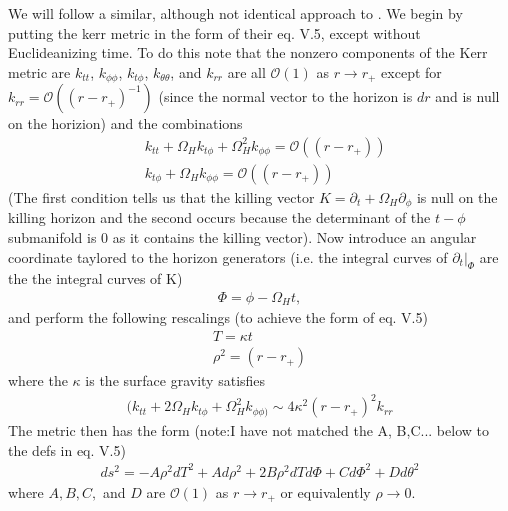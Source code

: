 \documentclass[aps,prd,amsmath,showpacs,amssymb,superscriptaddress,nofootinbib,longbibliography,eqsecnum,preprintnumbers]{revtex4-1}
\newcommand{\zach}[1]{\textcolor{ForestGreen}{#1}}
\begin{document}
We will follow a similar, although not identical approach to \cite{Dias:2015nua}. We begin by putting the kerr metric in the form of their eq. V.5, except without Euclideanizing time. To do this note that the nonzero components of the Kerr metric are $k_{tt}$, $k_{\phi\phi}$, $k_{t\phi}$, $k_{\theta\theta}$, and $k_{rr}$ are all $\mathcal{O}(1)$ as $r\to r_+$ except for $k_{rr}=\mathcal{O}\left((r-r_+)^{-1}\right)$ (since the normal vector to the horizon is $dr$ and is null on the horizion) and the combinations
\begin{align}
&k_{tt}+\Omega_H k_{t\phi}+\Omega_H^2 k_{\phi\phi}=\mathcal{O}((r-r_+))\nonumber \\
&k_{t\phi}+\Omega_Hk_{\phi\phi}=\mathcal{O}((r-r_+))
\end{align}
(The first condition tells us that  the killing vector $K= \partial_t +\Omega_H \partial_\phi$ is null on the killing horizon and the second occurs because the determinant of the $t-\phi$ submanifold is 0 as it contains the killing vector). 
Now introduce an angular coordinate taylored to the horizon generators (i.e. the integral curves of $\left .\partial_t \right|_{\Phi}$ are the the integral curves of K)
\begin{align}
\Phi=\phi -\Omega_H t,
\end{align}
and perform the following rescalings (to achieve the form of eq. V.5)
\begin{align}
&T=\kappa t \nonumber \\
&\rho^2=(r-r_+)&
\end{align}
where the $\kappa$ is the surface gravity satisfies
\begin{align}
(k_{tt}+2\Omega_H k_{t\phi}+\Omega_H^2 k_{\phi\phi)}\sim 4\kappa^2(r-r_+)^2k_{rr}
\end{align}
The metric then has the form (note:I have not matched the A, B,C... below to the defs in eq. V.5)
\begin{align}
ds^2=-A\rho^2dT^2+Ad\rho^2+2B\rho^2dTd\Phi+C d\Phi^2 +Dd\theta^2
\end{align}
where $A, B,C,$ and $D$ are $\mathcal{O}(1)$ as $r\to r_+$ or equivalently $\rho\to 0$.
\end{document}
